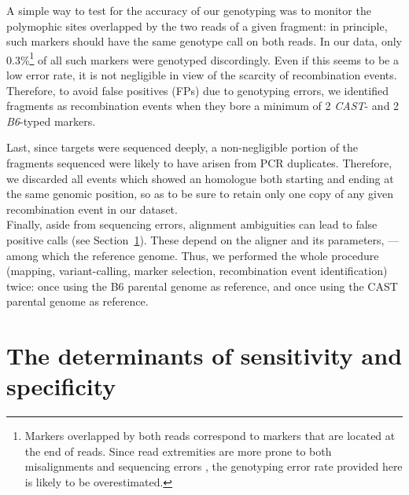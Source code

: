 A simple way to test for the accuracy of our genotyping was to monitor the polymophic sites overlapped by the two reads of a given fragment: in principle, such markers should have the same genotype call on both reads.
In our data, only 0.3\%\footnote{Markers overlapped by both reads correspond to markers that are located at the end of reads. Since read extremities are more prone to both misalignments and sequencing errors \citep{kircher2009improved,minoche2011evaluation,abnizova2012analysis,wang2012estimation,laehnemann2016denoising}, the genotyping error rate provided here is likely to be overestimated.} of all such markers were genotyped discordingly. 
Even if this seems to be a low error rate, it is not negligible in view of the scarcity of recombination events.
Therefore, to avoid false positives (FPs) due to genotyping errors, we identified fragments as recombination events when they bore a minimum of 2 \textit{CAST}- and 2 \textit{B6}-typed markers.

Last, since targets were sequenced deeply, a non-negligible portion of the fragments sequenced were likely to have arisen from PCR duplicates. 
Therefore, we discarded all events which showed an homologue both starting and ending at the same genomic position, so as to be sure to retain only one copy of any given recombination event in our dataset.\\

Finally, aside from sequencing errors, alignment ambiguities can lead to false positive calls (see Section~\ref{sec:determinants}).
These depend on the aligner and its parameters, — among which the reference genome.
Thus, we performed the whole procedure (mapping, variant-calling, marker selection, recombination event identification) twice: once using the B6 parental genome as reference, and once using the CAST parental genome as reference.


\section{The determinants of sensitivity and specificity}
\label{sec:determinants}

